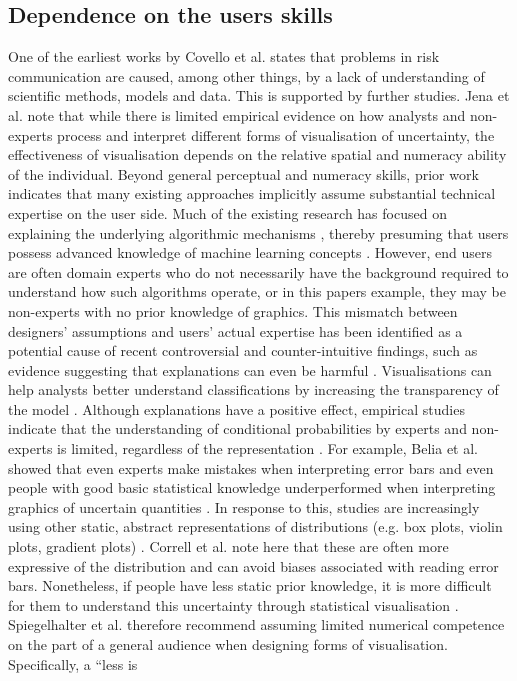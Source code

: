 \documentclass[final,journal,a4paper]{IEEEtran}
\begin{document}
\subsection{Dependence on the users skills} \label{Dependence on the user's skills}
One of the earliest works by Covello et al. \cite{Covello1988} states that problems in risk communication are caused, among other things, by a lack of understanding of scientific methods, models and data. This is supported by further studies. Jena et al. \cite{Jena2020} note that while there is limited empirical evidence on how analysts and non-experts process and interpret different forms of visualisation of uncertainty, the effectiveness of visualisation depends on the relative spatial and numeracy ability of the individual. Beyond general perceptual and numeracy skills, prior work indicates that many existing approaches implicitly assume substantial technical expertise on the user side. Much of the existing research has focused on explaining the underlying algorithmic mechanisms \cite{Liu2018}, thereby presuming that users possess advanced knowledge of machine learning concepts \cite{Liu2018}. However, end users are often domain experts who do not necessarily have the background required to understand how such algorithms operate, or in this papers example, they may be non-experts with no prior knowledge of graphics. This mismatch between designers’ assumptions and users’ actual expertise has been identified as a potential cause of recent controversial and counter-intuitive findings, such as evidence suggesting that explanations can even be harmful \cite{Stumpf2018}. Visualisations can help analysts better understand classifications by increasing the transparency of the model \cite{Yuan2021SurveyVisAnalyt}. Although explanations have a positive effect, empirical studies indicate that the understanding of conditional probabilities by experts and non-experts is limited, regardless of the representation \cite {Eddy1982, Tversky2013, Gigerenzer1995, Weber2018}. For example, Belia et al. \cite{Belia2005} showed that even experts make mistakes when interpreting error bars \cite{Belia2005} and even people with good basic statistical knowledge underperformed when interpreting graphics of uncertain quantities \cite{Ibrekk1987}. In response to this, studies are increasingly using other static, abstract representations of distributions (e.g. box plots, violin plots, gradient plots) \cite{Potter2010SummaryStatistics}. Correll et al. \cite{Correll2014} note here that these are often more expressive of the distribution and can avoid biases associated with reading error bars. Nonetheless, if people have less static prior knowledge, it is more difficult for them to understand this uncertainty through statistical visualisation \cite{Greis2017}. Spiegelhalter et al. \cite{Spiegelhalter2011} therefore recommend assuming limited numerical competence on the part of a general audience when designing forms of visualisation. Specifically, a ``less is 
\end{document}
